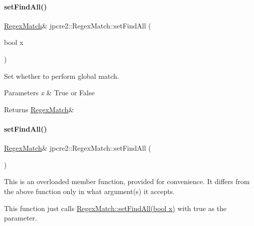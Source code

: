 \paragraph{\texorpdfstring{set\+Find\+All()}{setFindAll()}\hspace{0.1cm}{\footnotesize\ttfamily [1/2]}}
{\footnotesize\ttfamily \hyperlink{classjpcre2_1_1RegexMatch}{Regex\+Match}\& jpcre2\+::\+Regex\+Match\+::set\+Find\+All (\begin{DoxyParamCaption}\item[{bool}]{x }\end{DoxyParamCaption})\hspace{0.3cm}{\ttfamily [inline]}}



Set whether to perform global match. 


\begin{DoxyParams}{Parameters}
{\em x} & True or False \\
\hline
\end{DoxyParams}
\begin{DoxyReturn}{Returns}
\hyperlink{classjpcre2_1_1RegexMatch}{Regex\+Match}\& 
\end{DoxyReturn}
\hypertarget{classjpcre2_1_1RegexMatch_a9e04456a81606362a2ecdf748912e3ea_a9e04456a81606362a2ecdf748912e3ea}{}\label{classjpcre2_1_1RegexMatch_a9e04456a81606362a2ecdf748912e3ea_a9e04456a81606362a2ecdf748912e3ea} 
\paragraph{\texorpdfstring{set\+Find\+All()}{setFindAll()}\hspace{0.1cm}{\footnotesize\ttfamily [2/2]}}
{\footnotesize\ttfamily \hyperlink{classjpcre2_1_1RegexMatch}{Regex\+Match}\& jpcre2\+::\+Regex\+Match\+::set\+Find\+All (\begin{DoxyParamCaption}{ }\end{DoxyParamCaption})\hspace{0.3cm}{\ttfamily [inline]}}



This is an overloaded member function, provided for convenience. It differs from the above function only in what argument(s) it accepts.

This function just calls \hyperlink{classjpcre2_1_1RegexMatch_ae586d43ec197c57c66086eeb4f8d83a1_ae586d43ec197c57c66086eeb4f8d83a1}{Regex\+Match\+::set\+Find\+All(bool x)} with {\ttfamily true} as the parameter. 

